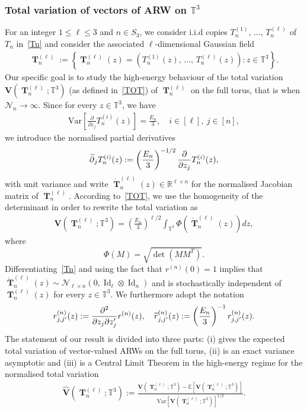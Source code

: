 \documentclass[AHL,Unicode,longabstracts,published]{cedram}
\DeclareMathOperator{\Id}{Id}
\DeclareMathOperator{\bT}{\mathbf{T}}
\newcommand{\scN}{\mathscr{N}}
\newcommand{\bfv}{\mathbf{V}}
\newcommand{\R}{\mathbb{R}}
\newcommand{\T}{\mathbb{T}^3}
\newcommand{\E}[1]{\mathbb{E}\left[#1\right]}
\newcommand{\V}[1]{\mathrm{Var}{\left[#1\right]}}
\newcommand{\Nn}{\mathcal{N}_n}
\let\oldtilde\tilde
\renewcommand*{\tilde}[1]{\mathchoice{\widetilde{#1}}{\widetilde{#1}}{\oldtilde{#1}}{\oldtilde{#1}}}
\begin{document}
\subsubsection*{Total variation of vectors of ARW on $\T$}
For an integer $1\leq \ell \leq 3$ and $n\in S_3$, we consider i.i.d copies $T_n^{(1)},\,\ldots,\,T_n^{(\ell)}$ of $T_n$ in~\eqref{Tn} and consider the associated $\ell$-dimensional Gaussian field
\begin{gather}\label{MultiARW}
\bT_n^{(\ell)}:=\left\{\bT_n^{(\ell)}(z)=\left(T_n^{(1)}(z),\,\ldots,\,T_n^{(\ell)}(z)\right):z \in \T\right\}.
\end{gather}
Our specific goal is to study the high-energy behaviour of the total variation $\bfv(\bT_n^{(\ell)}; \T)$ (as defined in~\eqref{TOT}) of $\bT_n^{(\ell)}$ on the full torus, that is when $\Nn\to \infty$. Since for every $z \in \T$, we have
\begin{gather*}
\V{\frac{\partial}{\partial {z_j}} T_n^{(i)}(z)} = \frac{E_n}{3}, \quad i\in [\ell], \ j \in [n],
\end{gather*}
we introduce the normalised partial derivatives
\begin{gather}\label{dernor}
\tilde{\partial}_{j}T_n^{(i)}(z) := \left(\frac{E_n}{3}\right)^{-1/2} \frac{\partial}{\partial {z_j}}T_n^{(i)}(z),
\end{gather}
with unit variance and write $\dot{\bT}_n^{(\ell)}(z) \in \R^{\ell \times n}$ for the normalised Jacobian matrix of $\bT_n^{(\ell)}$. According to~\eqref{TOT}, we use the homogeneity of the determinant in order to rewrite the total variation as
\begin{gather}\label{totdef}
\bfv\left(\bT_n^{(\ell)};\T\right) = \left(\frac{E_n}{3}\right)^{\ell/2}\int_{\T} \Phi\left(\dot{\bT}_n^{(\ell)}(z)\right) dz,
\end{gather}
where 
\[
\Phi(M)=\sqrt{\det\left(MM^T\right)}.
\]
Differentiating~\eqref{Tn} and using the fact that $r^{(n)}(0)=1$ implies that $\dot{\bT}_n^{(\ell)}(z) \sim \scN_{\ell \times n}(0, \Id_{\ell}\otimes \Id_n)$ and is stochastically independent of $\bT_n^{(\ell)}(z)$ for every $z \in \T$. We furthermore adopt the notation
\begin{gather}\label{rnnor}
{r}^{(n)}_{j,j'}(z) := \frac{\partial^2}{\partial z_j \partial z_j' } r^{(n)}(z), \quad
\tilde{r}^{(n)}_{j,j'}(z):=\left(\frac{E_n}{3}\right)^{-1} r^{(n)}_{j,j'}(z).
\end{gather}
The statement of our result is divided into three parts: (i) gives the expected total variation of vector-valued ARWs on the full torus, (ii) is an exact variance asymptotic and (iii) is a Central Limit Theorem in the high-energy regime for the normalised total variation
\begin{gather}\label{nor}
\widehat{\bfv}\left(\bT_n^{(\ell)};\T\right):=\frac{ \bfv\left(\bT_n^{(\ell)};\T\right)-\E{\bfv\left(\bT_n^{(\ell)};\T\right)}}{\V{\bfv\left(\bT_n^{(\ell)};\T\right)}^{1/2}}.
\end{gather}
\end{document}
